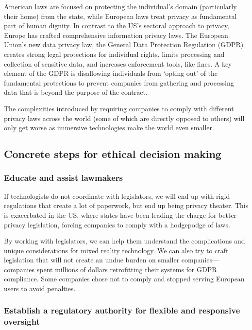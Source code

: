 American laws are focused on protecting the individual's domain (particularly their home) from the state, while European laws treat privacy as fundamental part of human dignity.
In contrast to the US's sectoral approach to privacy, Europe has crafted comprehensive information privacy laws. The European Union's new data privacy law, the General Data Protection Regulation (GDPR) creates strong legal protections for individual rights, limits processing and collection of sensitive data, and increases enforcement tools, like fines. A key element of the GDPR is disallowing individuals from `opting out' of the fundamental protections to prevent companies from gathering and processing data that is beyond the purpose of the contract.

The complexities introduced by requiring companies to comply with different privacy laws across the world (some of which are directly opposed to others) will only get worse as immersive technologies make the world even smaller.



\subsection{Concrete steps for ethical decision making}\label{sec:steps}
\subsubsection{Educate and assist lawmakers}
If technologists do not coordinate with legislators, we will end up with rigid regulations that create a lot of paperwork, but end up being privacy theater. This is exacerbated in the US, where states have been leading the charge for better privacy legislation, forcing companies to comply with a hodgepodge of laws.

By working with legislators, we can help them understand the complications and unique considerations for mixed reality technology. We can also try to craft legislation that will not create an undue burden on smaller companies---companies spent millions of dollars retrofitting their systems for GDPR compliance. Some companies chose not to comply and stopped serving European users to avoid penalties.

\subsubsection{Establish a regulatory authority for flexible and responsive oversight}

